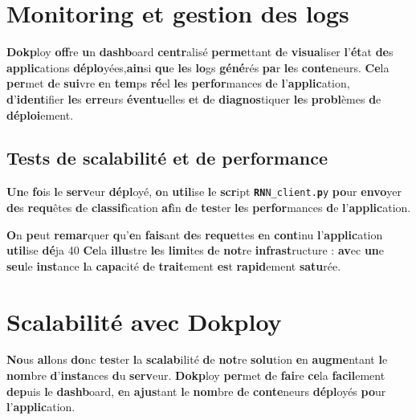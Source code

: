 \documentclass{rapportClass} %
\begin{document}
\section{Monitoring et gestion des logs}
\textbf{Dokp}loy \textbf{off}re \textbf{u}n \textbf{dashb}oard \textbf{centr}alisé \textbf{perme}ttant \textbf{d}e \textbf{visua}liser \textbf{l}'\textbf{ét}at \textbf{de}s \textbf{applic}ations \textbf{déplo}yées,\textbf{ain}si \textbf{qu}e \textbf{le}s 
\textbf{lo}gs \textbf{géné}rés \textbf{pa}r \textbf{le}s \textbf{conte}neurs. \textbf{Ce}la \textbf{per}met \textbf{d}e \textbf{sui}vre \textbf{e}n \textbf{tem}ps \textbf{ré}el \textbf{le}s \textbf{perfor}mances \textbf{d}e \textbf{l}'\textbf{applic}ation, 
\textbf{d}'\textbf{ident}ifier \textbf{le}s \textbf{erre}urs \textbf{éventu}elles \textbf{e}t \textbf{d}e \textbf{diagnos}tiquer \textbf{le}s \textbf{probl}èmes \textbf{d}e \textbf{déploi}ement. 



\subsection{Tests de scalabilité et de performance}
\textbf{Un}e \textbf{fo}is \textbf{l}e \textbf{serv}eur \textbf{dépl}oyé, \textbf{o}n \textbf{util}ise \textbf{l}e \textbf{scr}ipt \texttt{\textbf{RN}N_client.\textbf{p}y} \textbf{po}ur \textbf{envo}yer \textbf{de}s \textbf{requ}êtes \textbf{d}e \textbf{classif}ication 
\textbf{af}in \textbf{d}e \textbf{tes}ter \textbf{le}s \textbf{perfor}mances \textbf{d}e \textbf{l}’\textbf{applic}ation. 

\textbf{O}n \textbf{pe}ut \textbf{remar}quer \textbf{q}u'\textbf{e}n \textbf{fais}ant \textbf{de}s \textbf{reque}ttes \textbf{e}n \textbf{cont}inu \textbf{l}'\textbf{applic}ation \textbf{util}ise \textbf{dé}ja 40%
\textbf{Ce}la \textbf{illu}stre \textbf{le}s \textbf{limi}tes \textbf{d}e \textbf{not}re \textbf{infrast}ructure : \textbf{av}ec \textbf{un}e \textbf{seu}le \textbf{inst}ance \textbf{l}a \textbf{capa}cité \textbf{d}e \textbf{trait}ement \textbf{es}t \textbf{rapid}ement \textbf{satu}rée.

\section{Scalabilité avec Dokploy}
\textbf{No}us \textbf{all}ons \textbf{do}nc \textbf{tes}ter \textbf{l}a \textbf{scalab}ilité \textbf{d}e \textbf{not}re \textbf{solu}tion \textbf{e}n \textbf{augme}ntant \textbf{l}e \textbf{nom}bre \textbf{d}'\textbf{insta}nces \textbf{d}u \textbf{serv}eur. 
\textbf{Dokp}loy \textbf{per}met \textbf{d}e \textbf{fai}re \textbf{ce}la \textbf{facil}ement \textbf{dep}uis \textbf{l}e \textbf{dashb}oard, \textbf{e}n \textbf{ajus}tant \textbf{l}e \textbf{nom}bre \textbf{d}e \textbf{conte}neurs \textbf{dépl}oyés \textbf{po}ur 
\textbf{l}'\textbf{applic}ation.
\end{document}
